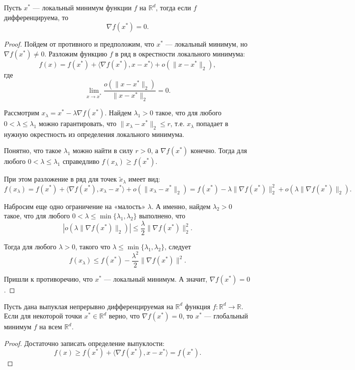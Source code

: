 \begin{theorem}
    Пусть $x^*$ — локальный минимум функции $f$ на $\mathbb{R}^d$, тогда если $f$ дифференцируема, то $$\nabla f(x^*) = 0.$$
\end{theorem}
\begin{proof}
    Пойдем от противного и предположим, что $x^*$ — локальный минимум, но $\nabla f(x^*) \neq 0$.
    Разложим функцию $f$ в ряд в окрестности локального минимума:
    $$f(x) = f(x^*) + \langle \nabla f(x^*), x - x^* \rangle + o(\|x - x^*\|_2),$$
    где $$\lim_{x \to x^*} \frac{o(\|x - x^*\|_2)}{\|x - x^*\|_2} = 0.$$

    Рассмотрим $x_\lambda = x^* - \lambda \nabla f(x^*)$. Найдем $\lambda_1 > 0$ такое,
    что для любого $0 < \lambda \leq \lambda_1$ можно гарантировать,
    что $\|x_\lambda - x^*\|_2 \leq r$, т.е. $x_\lambda$ попадает в нужную окрестность из определения локального минимума.

    Понятно, что такое $\lambda_1$ можно найти в силу $r > 0$, а $\nabla f(x^*)$ конечно.
    Тогда для любого $0 < \lambda \leq \lambda_1$ справедливо $f(x_\lambda) \geq f(x^*)$.

    При этом разложение в ряд для точек $\tilde{x}_\lambda$ имеет вид:
    $$f(x_\lambda) = f(x^*) + \langle \nabla f(x^*), x_\lambda - x^* \rangle + o(\|x_\lambda - x^*\|_2)
        = f(x^*) - \lambda \|\nabla f(x^*)\|_2^2 + o(\lambda \|\nabla f(x^*)\|_2).$$

    Набросим еще одно ограничение на «малость» $\lambda$. А именно, найдем $\lambda_2 > 0$ такое,
    что для любого $0 < \lambda \leq \min\{\lambda_1, \lambda_2\}$ выполнено, что
    $$|o(\lambda \|\nabla f(x^*)\|_2)| \leq \frac{\lambda}{2} \|\nabla f(x^*)\|_2^2.$$

    Тогда для любого $\lambda > 0$, такого что $\lambda \leq \min\{\lambda_1, \lambda_2\}$, следует
    $$f(x_\lambda) \leq f(x^*) - \frac{\lambda^2}{2} \|\nabla f(x^*)\|^2.$$

    Пришли к противоречию, что $x^*$ — локальный минимум. А значит, $\nabla f(x^*) = 0$.
\end{proof}

\begin{theorem}
    Пусть дана выпуклая непрерывно дифференцируемая на $\mathbb{R}^d$ функция $f : \mathbb{R}^d \to \mathbb{R}$.
    Если для некоторой точки $x^* \in \mathbb{R}^d$ верно, что $\nabla f(x^*) = 0$,
    то $x^*$ — глобальный минимум $f$ на всем $\mathbb{R}^d$.
\end{theorem}
\begin{proof}
    Достаточно записать определение выпуклости:
    $$f(x) \geq f(x^*) + \langle \nabla f(x^*), x - x^* \rangle = f(x^*).$$
\end{proof}

